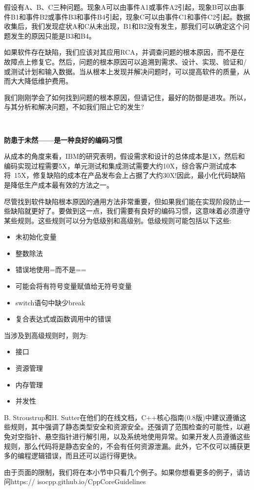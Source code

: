 假设有A、B、C三种问题。现象A可以由事件A1或事件A2引起，现象B可以由事件B1和事件B2或事件B3和事件B4引起，现象C可以由事件C1和事件C2引起。数据收集后，我们发现症状A和C从未出现，B1和B2没有发生，那我们可以确定这个问题发生的原因只能是B3和B4。 \par
如果软件存在缺陷，我们应该对其应用RCA，并调查问题的根本原因，而不是在故障点上修复它。然后，问题的根本原因可以追溯到需求、设计、实现、验证和/或测试计划和输入数据。当从根本上发现并解决问题时，可以提高软件的质量，从而大大降低维护费用。 \par
我们刚刚学会了如何找到问题的根本原因，但请记住，最好的防御是进攻。所以，与其分析和解决问题，不如我们阻止它的发生? \par

\noindent\textbf{}\ \par
\textbf{防患于未然——是一种良好的编码习惯} \ \par
从成本的角度来看，IBM的研究表明，假设需求和设计的总体成本是1X，然后和编码实现过程需要5X，单元测试和集成测试需要大约10X，综合客户测试成本将~15X，修复缺陷的成本在产品发布会上占据了大约30X!因此，最小化代码缺陷是降低生产成本最有效的方法之一。 \par
尽管找到软件缺陷根本原因的通用方法非常重要，但如果我们能在实现阶段防止一些缺陷就更好了。要做到这一点，我们需要有良好的编码习惯，这意味着必须遵守某些规则。这些规则可以分为低级别和高级别。低级规则可能包括以下这些: \par

\begin{itemize}
	\item 未初始化变量
	\item 整数除法
	\item 错误地使用=而不是==
	\item 可能会将有符号变量赋值给无符号变量
	\item switch语句中缺少break
	\item 复合表达式或函数调用中的错误
\end{itemize}

当涉及到高级规则时，则为: \par

\begin{itemize}
	\item 接口
	\item 资源管理
	\item 内存管理
	\item 并发性
\end{itemize}

B. Stroustrup和H. Sutter在他们的在线文档，C++核心指南(0.8版)中建议遵循这些规则，其中强调了静态类型安全和资源安全。还强调了范围检查的可能性，以避免对空指针、悬空指针进行解引用，以及系统地使用异常。如果开发人员遵循这些规则，那么代码将是静态安全的，不会有任何资源泄漏。此外，它不仅可以捕获更多的编程逻辑错误，而且还可以运行得更快。 \par
由于页面的限制，我们将在本小节中只看几个例子。如果你想看更多的例子，请访问https:// isocpp.github.io/CppCoreGuidelines \par

